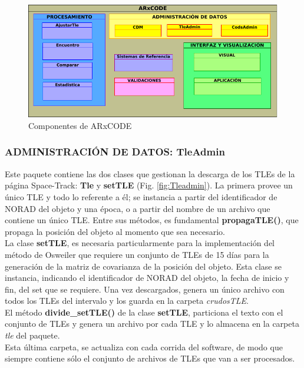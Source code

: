\begin{figure}[h!]
  \centering
  \includegraphics[width=.8\textwidth]{imagenes/componentesAR}  
  \caption{Componentes de ARxCODE}
  \label{fig:componentes}
\end{figure}

\subsubsection*{ADMINISTRACI\'ON DE DATOS: TleAdmin}
Este paquete contiene las dos clases que gestionan la descarga de los TLEs de la p\'agina Space-Track: {\bf{Tle}} y {\bf{setTLE}} (Fig. \ref{fig:Tleadmin}). La primera provee un \'unico TLE y todo lo referente a \'el; se instancia a partir del identificador de NORAD del objeto y una \'epoca, o a partir del nombre de un archivo que contiene un \'unico TLE. Entre sus m\'etodos, es fundamental {\bf{propagaTLE()}}, que propaga la posici\'on del objeto al momento que sea necesario.\\

La clase {\bf{setTLE}}, es necesaria particularmente para la implementaci\'on del m\'etodo de Osweiler que requiere un conjunto de TLEs de 15 d\'ias para la generaci\'on de la matriz de covarianza de la posici\'on del objeto. Esta clase se instancia, indicando el identificador de NORAD del objeto, la fecha de inicio y fin, del set que se requiere. Una vez descargados, genera un \'unico archivo con todos los TLEs del intervalo y los guarda en la carpeta {\it{crudosTLE}}.\\
El m\'etodo {\bf{divide\_setTLE()}} de la clase {\bf{setTLE}}, particiona el texto con el conjunto de TLEs y genera un archivo por cada TLE y lo almacena en la carpeta {\it{tle}} del paquete.\\
Esta \'ultima carpeta, se actualiza con cada corrida del software, de modo que siempre contiene s\'olo el conjunto de archivos de TLEs que van a ser procesados.\\

